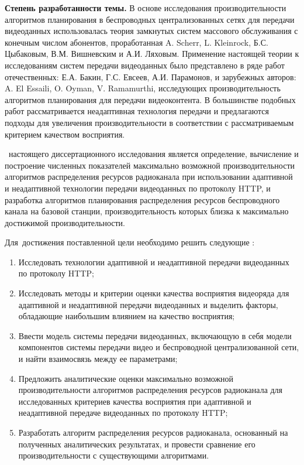 \textbf{Степень разработанности темы.} В основе исследования производительности алгоритмов планирования в беспроводных централизованных сетях для передачи видеоданных использовалась теория замкнутых систем массового обслуживания с конечным числом абонентов, проработанная A. Scherr, L. Kleinrock, Б.С. Цыбаковым, В.М. Вишневским и А.И. Ляховым. Применение настоящей теории к исследованиям систем передачи видеоданных было представлено в ряде работ отечественных: Е.А. Бакин, Г.С. Евсеев, А.И. Парамонов, и зарубежных авторов: A. El Essaili, O. Oyman, V. Ramamurthi, исследующих производительность алгоритмов планирования для передачи видеоконтента. В большинстве подобных работ рассматривается неадаптивная технология передачи и предлагаются подходы для увеличения производительности в соответствии с рассматриваемым критерием качеством восприятия.

\aim\ настоящего диссертационного исследования является определение, вычисление и построение численных показателей максимально возможной производительности алгоритмов распределения ресурсов радиоканала при использовании адаптивной и неадаптивной технологии передачи видеоданных по протоколу HTTP, и разработка алгоритмов планирования распределения ресурсов беспроводного канала на базовой станции, производительность которых близка к максимально достижимой производительности.

Для~достижения поставленной цели необходимо решить следующие {\tasks}:
\begin{enumerate}
    \item Исследовать технологии адаптивной и неадаптивной передачи видеоданных по протоколу HTTP;
    \item Исследовать методы и критерии оценки качества восприятия видеоряда для адаптивной и неадаптивной передачи видеоданных и выделить факторы, обладающие наибольшим влиянием на качество восприятия;
    \item Ввести модель системы передачи видеоданных, включающую в себя модели компонентов системы передачи видео и беспроводной централизованной сети, и найти взаимосвязь между ее параметрами;
    \item Предложить аналитические оценки максимально возможной производительности алгоритмов распределения ресурсов радиоканала для исследованных критериев качества восприятия при адаптивной и неадаптивной передаче видеоданных по протоколу HTTP;
    \item Разработать алгоритм распределения ресурсов радиоканала, основанный на полученных аналитических результатах, и провести сравнение его производительности с существующими алгоритмами.
\end{enumerate}

